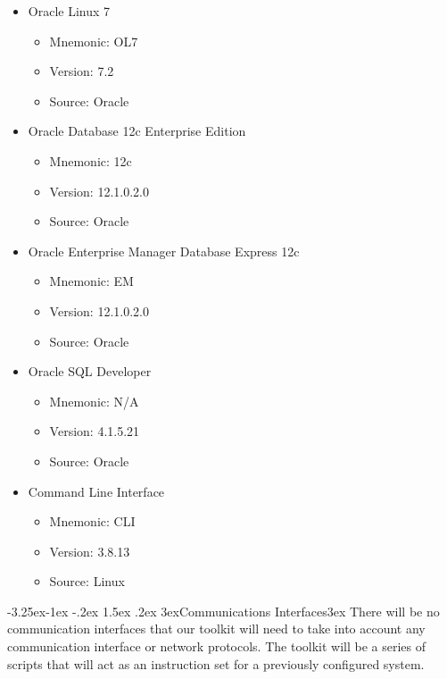 \documentclass[draftclsnofoot, onecolumn, compsoc, 10pt]{IEEEtran}
\makeatletter
\newcommand\Xsubsubsection{\@startsection{subsubsection}{3}{\z@}%
                                     {-3.25ex\@plus -1ex \@minus -.2ex}%
                                     {1.5ex \@plus .2ex}%
                                     {\normalfont\normalsize\leftskip 3ex}}
\renewcommand\subsubsection[1]{\Xsubsubsection{#1}\leftskip 3ex}
\makeatother
\begin{document}
\begin{itemize}
	\item Oracle Linux 7
	\begin{itemize}
		\item Mnemonic: OL7
		\item Version: 7.2
        \item Source: Oracle
	\end{itemize}
	\item Oracle Database 12c Enterprise Edition
	\begin{itemize}
		\item Mnemonic: 12c
        \item Version: 12.1.0.2.0
        \item Source: Oracle
	\end{itemize}
    \item Oracle Enterprise Manager Database Express 12c
	\begin{itemize}
		\item Mnemonic: EM
        \item Version: 12.1.0.2.0
        \item Source: Oracle
	\end{itemize}
   	\item Oracle SQL Developer
	\begin{itemize}
		\item Mnemonic: N/A
        \item Version: 4.1.5.21
        \item Source: Oracle
	\end{itemize}
    \item Command Line Interface
	\begin{itemize}
		\item Mnemonic: CLI
        \item Version: 3.8.13
        \item Source: Linux
	\end{itemize}
\end{itemize}


\subsubsection{Communications Interfaces}
There will be no communication interfaces that our toolkit will need to take into account any communication interface or network protocols.
The toolkit will be a series of scripts that will act as an instruction set for a previously configured system.
\end{document}
